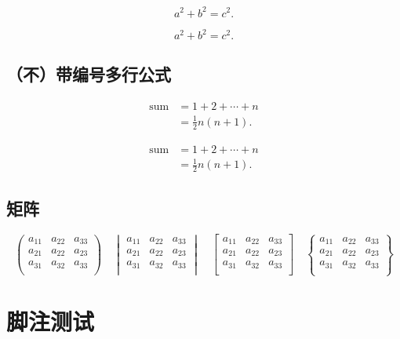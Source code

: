 \documentclass[type = bachelor]{whu-thesis}
\begin{document}
\begin{equation}
  a^2 + b^2 = c^2.
\end{equation}

\[ a^2 + b^2 = c^2.\]

\subsection{（不）带编号多行公式}

\begin{align}
  \text{sum} & = 1 + 2 + \cdots + n \\
             & = \frac12 n(n+1).
\end{align}

\begin{align*}
  \text{sum} & = 1 + 2 + \cdots + n \\
             & = \frac12 n(n+1).
\end{align*}

\subsection{矩阵}

\[\begin{pmatrix}
  a_{11} & a_{22} & a_{33} \\
  a_{21} & a_{22} & a_{23} \\
  a_{31} & a_{32} & a_{33} \\
\end{pmatrix} \quad
\begin{vmatrix}
  a_{11} & a_{22} & a_{33} \\
  a_{21} & a_{22} & a_{23} \\
  a_{31} & a_{32} & a_{33} \\
\end{vmatrix} \quad
\begin{bmatrix}
  a_{11} & a_{22} & a_{33} \\
  a_{21} & a_{22} & a_{23} \\
  a_{31} & a_{32} & a_{33} \\
\end{bmatrix} \quad
\begin{Bmatrix}
  a_{11} & a_{22} & a_{33} \\
  a_{21} & a_{22} & a_{23} \\
  a_{31} & a_{32} & a_{33} \\
\end{Bmatrix}\]

\section{脚注测试}
\end{document}

